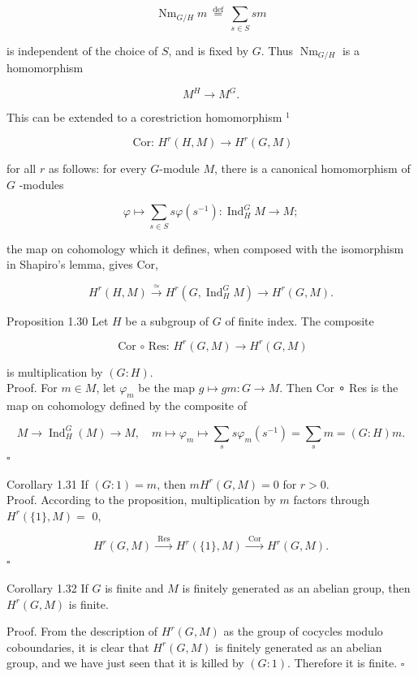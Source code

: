 \documentclass[10pt]{article}
\begin{document}
$$
\operatorname{Nm}_{G / H} m \stackrel{\text { def }}{=} \sum_{s \in S} s m
$$

is independent of the choice of $S$, and is fixed by $G$. Thus $\operatorname{Nm}_{G / H}$ is a homomorphism

$$
M^{H} \rightarrow M^{G} .
$$

This can be extended to a corestriction homomorphism ${ }^{1}$

$$
\text { Cor: } H^{r}(H, M) \rightarrow H^{r}(G, M)
$$

for all $r$ as follows: for every $G$-module $M$, there is a canonical homomorphism of $G$ -modules

$$
\varphi \mapsto \sum_{s \in S} s \varphi\left(s^{-1}\right): \operatorname{Ind}_{H}^{G} M \rightarrow M ;
$$

the map on cohomology which it defines, when composed with the isomorphism in Shapiro's lemma, gives Cor,

$$
H^{r}(H, M) \xrightarrow{\simeq} H^{r}\left(G, \operatorname{Ind}_{H}^{G} M\right) \rightarrow H^{r}(G, M) .
$$

Proposition 1.30 Let $H$ be a subgroup of $G$ of finite index. The composite

$$
\text { Cor ∘ Res: } H^{r}(G, M) \rightarrow H^{r}(G, M)
$$

is multiplication by $(G: H)$.\\
Proof. For $m \in M$, let $\varphi_{m}$ be the map $g \mapsto g m: G \rightarrow M$. Then Cor ∘ Res is the map on cohomology defined by the composite of

$$
M \rightarrow \operatorname{Ind}_{H}^{G}(M) \rightarrow M, \quad m \mapsto \varphi_{m} \mapsto \sum_{s} s \varphi_{m}\left(s^{-1}\right)=\sum_{s} m=(G: H) m .
$$ \(\square\)

Corollary 1.31 If $(G: 1)=m$, then $m H^{r}(G, M)=0$ for $r>0$.\\
Proof. According to the proposition, multiplication by $m$ factors through $H^{r}(\{1\}, M)=$ 0,

$$
H^{r}(G, M) \xrightarrow{\text { Res }} H^{r}(\{1\}, M) \xrightarrow{\text { Cor }} H^{r}(G, M) .
$$ \(\square\)

Corollary 1.32 If $G$ is finite and $M$ is finitely generated as an abelian group, then $H^{r}(G, M)$ is finite.

Proof. From the description of $H^{r}(G, M)$ as the group of cocycles modulo coboundaries, it is clear that $H^{r}(G, M)$ is finitely generated as an abelian group, and we have just seen that it is killed by $(G: 1)$. Therefore it is finite. \(\square\)
\end{document}

